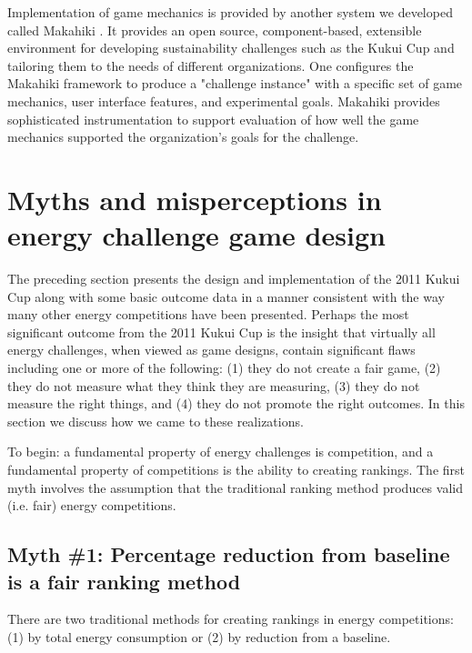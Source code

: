 \documentclass[jou]{apa} %
\begin{document}
Implementation of game mechanics is provided by another system we developed called
Makahiki \cite{csdl2-11-07}.  It provides an open source, component-based, extensible
environment for developing sustainability challenges such as the Kukui Cup and tailoring
them to the needs of different organizations.  One configures the Makahiki framework to
produce a "challenge instance" with a specific set of game mechanics, user interface
features, and experimental goals.  Makahiki provides sophisticated instrumentation to
support evaluation of how well the game mechanics supported the organization's goals for
the challenge.

\section{Myths and misperceptions in energy challenge game design}

The preceding section presents the design and implementation of the 2011 Kukui Cup along
with some basic outcome data in a manner consistent with the way many other energy
competitions have been presented.  Perhaps the most significant outcome from the 2011
Kukui Cup is the insight that virtually all energy challenges, when viewed as game
designs, contain significant flaws including one or more of the following: (1) they do not
create a fair game, (2) they do not measure what they think they are measuring, (3) they do not
measure the right things, and (4) they do not promote the right outcomes.  In this section we
discuss how we came to these realizations.

To begin: a fundamental property of energy challenges is competition, and a fundamental
property of competitions is the ability to creating rankings.  The first myth involves the
assumption that the traditional ranking method produces valid (i.e. fair) energy competitions.

\subsection{Myth \#1: Percentage reduction from baseline is a fair ranking method}

There are two traditional methods for creating rankings in energy
competitions: (1) by total energy consumption or (2) by reduction from a baseline.
\end{document}
